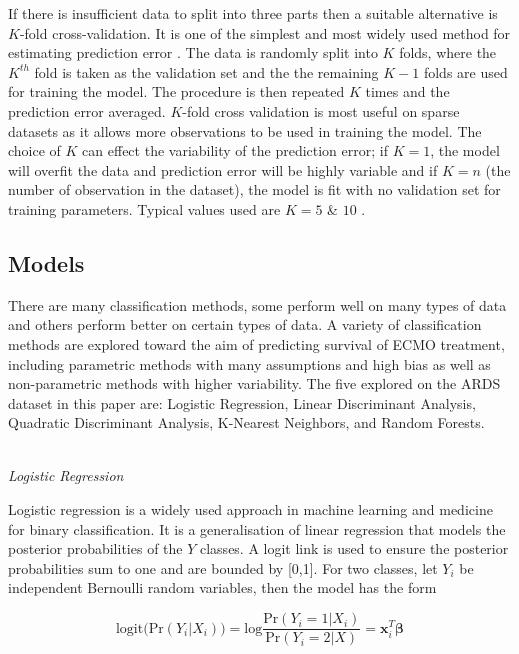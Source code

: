 \documentclass[12pt,]{article}
\begin{document}
If there is insufficient data to split into three parts then a suitable
alternative is \(K\)-fold cross-validation. It is one of the simplest
and most widely used method for estimating prediction error
\autocite{hastie_elements_2009}. The data is randomly split into \(K\)
folds, where the \(K^{th}\) fold is taken as the validation set and the
the remaining \(K-1\) folds are used for training the model. The
procedure is then repeated \(K\) times and the prediction error
averaged. \(K\)-fold cross validation is most useful on sparse datasets
as it allows more observations to be used in training the model. The
choice of \(K\) can effect the variability of the prediction error; if
\(K=1\), the model will overfit the data and prediction error will be
highly variable and if \(K=n\) (the number of observation in the
dataset), the model is fit with no validation set for training
parameters. Typical values used are \(K=5\) \& \(10\)
\autocites{hastie_elements_2009}{breiman_submodel_1992}{kohavi_study_1995}.

\subsection{Models}\label{models}

There are many classification methods, some perform well on many types
of data and others perform better on certain types of data. A variety of
classification methods are explored toward the aim of predicting
survival of ECMO treatment, including parametric methods with many
assumptions and high bias as well as non-parametric methods with higher
variability. The five explored on the ARDS dataset in this paper are:
Logistic Regression, Linear Discriminant Analysis, Quadratic
Discriminant Analysis, K-Nearest Neighbors, and Random Forests.

\(~\)\\
\emph{Logistic Regression}

Logistic regression is a widely used approach in machine learning and
medicine for binary classification. It is a generalisation of linear
regression that models the posterior probabilities of the \(Y\) classes.
A logit link is used to ensure the posterior probabilities sum to one
and are bounded by {[}0,1{]}. For two classes, let \(Y_i\) be
independent Bernoulli random variables, then the model has the form

\[
\text{logit} \Big( \text{Pr}(Y_i \vert X_i) \Big) = \text{log} \frac{ \text{Pr}(Y_i=1 \vert X_i) }{ \text{Pr}(Y_i=2 \vert X) }  = \mathbf{x}^T_i\boldsymbol{\beta}  
\]
\end{document}
